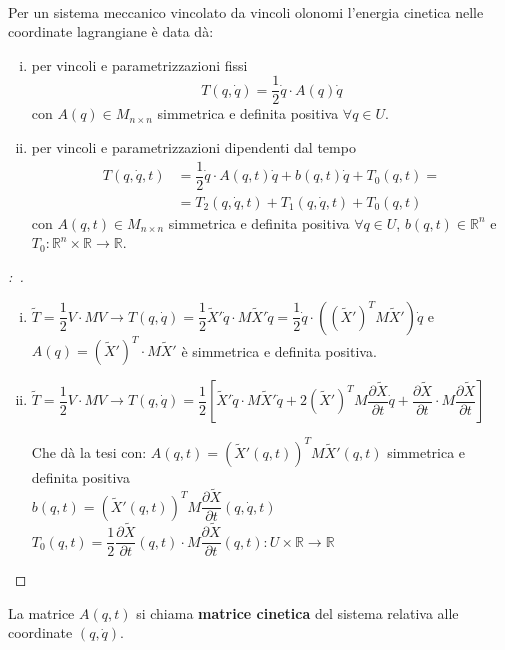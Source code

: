 \documentclass[11pt,a4paper,twoside]{book}
\newenvironment{proposizione}[1][\empty]{\begin{Proposizione}{
\ifx\empty#1\relax\else\mdseries\itshape#1\\\fi
}{}}{\end{Proposizione}}
\newenvironment{dimo}[1][\proofname]{
	\begin{tcolorbox}[
	breakable, 
	enhanced, 
	interior hidden, 
	frame hidden, 
	borderline west = {1pt}{0pt}{gray}, 
	top=0pt, bottom=0pt, left=0pt]
\begin{proof}[#1:~]
}
{
\end{proof}
\end{tcolorbox}
}
\theoremstyle{esss}
\theoremstyle{dotless}
\numberwithin{equation}{section} %
\begin{document}
\begin{proposizione}
Per un sistema meccanico vincolato da vincoli olonomi l'energia cinetica nelle coordinate lagrangiane è data dà:
\begin{enumerate}[i.]
\item per vincoli e parametrizzazioni fissi 
\[
T(q,\dot{q})=\dfrac{1}{2}\dot{q} \cdot A(q) \dot{q}
\]
con $A(q)\in M_{n\times n}$ simmetrica e definita positiva $\forall q\in U$.
\item per vincoli e parametrizzazioni dipendenti dal tempo
\begin{align*}
T(q,\dot{q},t)&= \dfrac{1}{2} \dot{q} \cdot A(q,t)\dot{q} + b(q,t) \dot{q} + T_0(q,t)=\\
&=T_2(q,\dot{q},t)+T_1(q,\dot{q},t)+T_0(q,t)
\end{align*}
con $A(q,t)\in M_{n\times n}$ simmetrica e definita positiva $\forall q\in U$, $b(q,t)\in\mathbb{R}^n$ e $T_0:\mathbb{R}^n\times\mathbb{R}\rightarrow\mathbb{R}$.
\end{enumerate}
\end{proposizione}
\begin{dimo}
\begin{enumerate}[i.]
\item $\tilde{T} =\dfrac{1}{2}V\cdot MV \longrightarrow T(q,\dot{q})=\dfrac{1}{2} \tilde{X}'\dot{q} \cdot M \tilde{X}'\dot{q} = \dfrac{1}{2} \dot{q} \cdot\left((\tilde{X}')^T  M \tilde{X}' \right)\dot{q} $ e $A(q)=(\tilde{X}')^T \cdot M \tilde{X}'$ è simmetrica e definita positiva.
\item $\tilde{T} =\dfrac{1}{2}V\cdot MV \longrightarrow T(q,\dot{q})=\dfrac{1}{2} \left[ \tilde{X}'\dot{q} \cdot M \tilde{X}'\dot{q} + 2 (\tilde{X}')^T M \dfrac{\partial \tilde{X}}{\partial t}  \dot{q} + \dfrac{\partial \tilde{X}}{\partial t}\cdot M \dfrac{\partial \tilde{X}}{\partial t}
\right] $ 

Che dà la tesi con:
$A(q,t)=\left(\tilde{X}'(q,t)\right)^T M \tilde{X}'(q,t) $ simmetrica e definita positiva\\ $b(q,t)= \left(\tilde{X}'(q,t)\right)^T M \dfrac{\partial \tilde{X}}{\partial t} (q,\dot{q},t) $ \\ $T_0(q,t) = \dfrac{1}{2}\dfrac{\partial \tilde{X}}{\partial t}(q,t)\cdot M \dfrac{\partial \tilde{X}}{\partial t}(q,t) :U\times\mathbb{R}\rightarrow\mathbb{R}$\qedhere
\end{enumerate}
\end{dimo}

La matrice $A(q,t)$ si chiama \textbf{matrice cinetica} del sistema relativa alle coordinate $(q,\dot{q})$.
\end{document}
